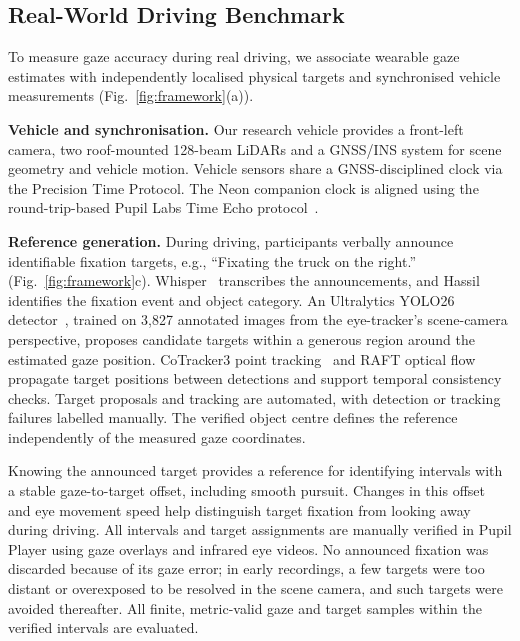 
\subsection{Real-World Driving Benchmark}
\label{sec:method_driving}

To measure gaze accuracy during real driving, we associate
wearable gaze estimates with independently localised physical
targets and synchronised vehicle measurements
(Fig.~\ref{fig:framework}(a)).

\textbf{Vehicle and synchronisation.}
Our research vehicle provides a front-left camera, two
roof-mounted 128-beam LiDARs and a GNSS/INS system
for scene geometry and vehicle motion. Vehicle sensors share
a GNSS-disciplined clock via the Precision Time Protocol.
The Neon companion clock is aligned using the round-trip-based
Pupil Labs Time Echo protocol~\cite{pupil_time_echo}.


\textbf{Reference generation.}
During driving, participants verbally announce identifiable
fixation targets, e.g., ``Fixating the truck on the right.''
(Fig.~\ref{fig:framework}c). Whisper~\cite{radford2023whisper} transcribes the announcements,
and Hassil~\cite{hassil} identifies the fixation event and object category.
An Ultralytics YOLO26 detector~\cite{ultralytics_yolo}, trained on 3,827 annotated
images from the eye-tracker's scene-camera perspective,
proposes candidate targets within a generous region around
the estimated gaze position.
CoTracker3 point tracking~\cite{karaev2025cotracker3}
and RAFT optical flow~\cite{teed2020raft}
propagate target positions between detections and support
temporal consistency checks. Target proposals and tracking
are automated, with detection or tracking failures labelled
manually. The verified object centre defines the reference
independently of the measured gaze coordinates.

Knowing the announced target provides a reference for
identifying intervals with a stable gaze-to-target offset,
including smooth pursuit. Changes in this offset and eye
movement speed help distinguish target fixation from looking
away during driving. All intervals and target assignments
are manually verified in Pupil Player using gaze overlays
and infrared eye videos. No announced fixation was discarded
because of its gaze error; in early recordings, a few targets
were too distant or overexposed to be resolved in the scene
camera, and such targets were avoided thereafter. All finite,
metric-valid gaze and target samples within the verified intervals
are evaluated.


